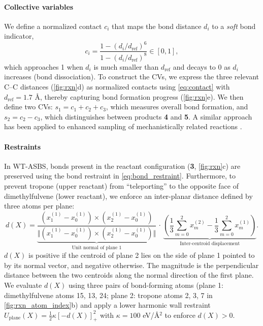 \documentclass[]{fairmeta}
\theoremstyle{remark}
\begin{document}
\paragraph{Collective variables}
We define a normalized contact $c_i$ that maps the bond distance $d_i$ to a \textit{soft} bond indicator,
\begin{equation}
c_i = \frac{1-(d_i/d_\text{ref})^6}{1-(d_i/d_\text{ref})^8} \in [0, 1],
\label{eq:contact}
\end{equation}
which approaches 1 when $d_i$ is much smaller than $d_\text{ref}$ and decays to 0 as $d_i$ increases (bond dissociation).
To construct the CVs, we express the three relevant C--C distances (\cref{fig:rxn}d) as normalized contacts using \cref{eq:contact} with $d_\text{ref} = 1.7$ \AA{}, thereby capturing bond formation progress (\cref{fig:rxn}e).
We then define two CVs: $s_1 = c_1 + c_2 + c_3$, which measures overall bond formation, and $s_2 = c_2 - c_3$, which distinguishes between products \textbf{4} and \textbf{5}. A similar approach has been applied to enhanced sampling of mechanistically related reactions \citep{nam2023enhanced}.

\paragraph{Restraints}
In WT-ASBS, bonds present in the reactant configuration (\textbf{3}, \cref{fig:rxn}c) are preserved using the bond restraint in \cref{eq:bond_restraint}.
Furthermore, to prevent tropone (upper reactant) from ``teleporting'' to the opposite face of dimethylfulvene (lower reactant), we enforce an inter-planar distance defined by three atoms per plane:
\begin{equation}
d(X) = \underbrace{\frac{(x^{(1)}_1 - x^{(1)}_0) \times (x^{(1)}_2 - x^{(1)}_0)}{\Vert(x^{(1)}_1 - x^{(1)}_0) \times (x^{(1)}_2 - x^{(1)}_0)\Vert}}_{\text{Unit normal of plane 1}} \,\cdot\, \underbrace{\left( \frac{1}{3}\sum_{m=0}^2 x^{(2)}_m - \frac{1}{3}\sum_{m=0}^2 x^{(1)}_m \right)}_{\text{Inter-centroid displacement}}.
\label{eq:planar_distance}
\end{equation}
$d(X)$ is positive if the centroid of plane 2 lies on the side of plane 1 pointed to by its normal vector, and negative otherwise.
The magnitude is the perpendicular distance between the two centroids along the normal direction of the first plane.
We evaluate $d(X)$ using three pairs of bond-forming atoms (plane 1: dimethylfulvene atoms 15, 13, 24; plane 2: tropone atoms 2, 3, 7 in \cref{fig:rxn_atom_index}b) and apply a lower harmonic wall restraint $U_\text{plane}(X) = \frac{1}{2} \kappa [-d(X)]_+^2$ with $\kappa = 100$ eV/\AA{}$^2$ to enforce $d(X) > 0$.
\end{document}
